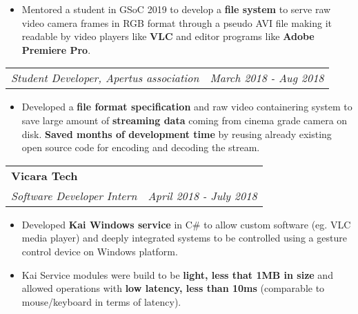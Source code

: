 \documentclass[a4paper,6pt]{article}
\begin{document}
\small
\begin{itemize}
	\itemsep0em
    \item Mentored a student in GSoC 2019 to develop a \textcolor{mygray}{\textbf{file system}} to serve raw video camera frames in RGB format through a pseudo AVI file making it readable by video players like \textcolor{mygray}{\textbf{VLC}} and editor programs like \textcolor{mygray}{\textbf{Adobe Premiere Pro}}.
\end{itemize}

\normalsize
\vspace{2px}
\hspace{5px}
\begin{tabularx}{\textwidth}{X r}
	\textit{\small Student Developer, Apertus association}& \textit{March 2018 - Aug 2018} \\
\end{tabularx}
\small
\begin{itemize}
	\itemsep0em
	\item Developed a \textcolor{mygray}{\textbf{file format specification}} and raw video containering system to save large amount of \textcolor{mygray}{\textbf{streaming data}} coming from cinema grade camera on disk. \textcolor{mygray}{\textbf{Saved months of development time}} by reusing already existing open source code for encoding and decoding the stream.
\end{itemize}
\normalsize

\vspace{6px}
\hspace{5px}
\begin{tabularx}{\textwidth}{X r}
	\large{\textbf{Vicara Tech}} & \\
	\textit{\small Software Developer Intern}& \textit{April 2018 - July 2018} \\
\end{tabularx}

\small
\begin{itemize}
	\itemsep0em
	\item Developed \textcolor{mygray}{\textbf{Kai Windows service}} in C\# to allow custom software (eg. VLC media player) and deeply integrated systems to be controlled using a gesture control device on Windows platform.
	\item Kai Service modules were build to be \textcolor{mygray}{\textbf{light, less that 1MB in size}} and allowed operations with \textcolor{mygray}{\textbf{low latency, less than 10ms}} (comparable to mouse/keyboard in terms of latency).
\end{itemize}
\normalsize
\end{document}
